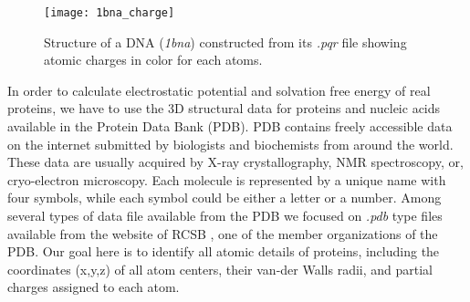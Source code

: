 \begin{figure}[H]
	\centering
	\texttt{[image: 1bna\_charge]}
	\caption{Structure of a DNA (\textit{1bna}) constructed from its {\it .pqr} file showing atomic charges in color for each atoms.} 
\end{figure}
In order to calculate electrostatic potential and solvation free energy of real proteins,  we have to use the 3D structural data for proteins and nucleic acids available in the Protein Data Bank (PDB). PDB contains freely accessible data on the internet submitted by biologists and biochemists from around the world. These data are usually acquired by  X-ray crystallography, NMR spectroscopy, or, cryo-electron microscopy. Each molecule is represented by a unique name with four symbols, while each symbol could be either a letter or a number. Among several types of data file available from the PDB we focused on \textit{.pdb} type files available from the website of RCSB \cite{RCSB}, one of the member organizations of the PDB. Our goal here is to identify all atomic details of proteins, including the coordinates (x,y,z) of all atom centers, their van-der Walls radii, and partial charges assigned to each atom. 

